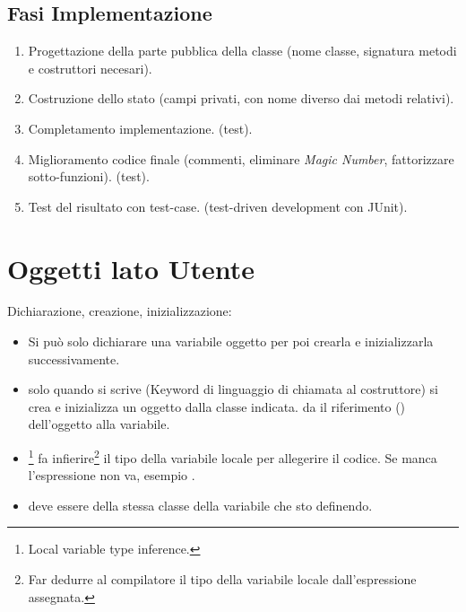 \subsection{Fasi Implementazione}
\begin{enumerate}
	\item Progettazione della parte pubblica della classe (nome classe, signatura metodi e costruttori necesari).
	\item Costruzione dello stato (campi privati, con nome diverso dai metodi relativi).
	\item Completamento implementazione. (test).
	\item Miglioramento codice finale (commenti, eliminare \textit{Magic Number}, fattorizzare sotto-funzioni). (test).
	\item Test del risultato con test-case. (test-driven development con JUnit).
\end{enumerate}

\section{Oggetti lato Utente}
Dichiarazione, creazione, inizializzazione:

\begin{itemize}
	\item {} Si può solo dichiarare una variabile oggetto per poi crearla e inizializzarla successivamente.
	\item solo quando si scrive  (Keyword di linguaggio di chiamata al costruttore) si crea e inizializza un oggetto dalla classe indicata.  da il riferimento () dell'oggetto alla variabile.
	\item {}\footnote{Local variable type inference.} fa infierire\footnote{Far dedurre al compilatore il tipo della variabile locale dall'espressione assegnata.} il tipo della variabile locale per allegerire il codice. Se manca l'espressione non va, esempio .
	\item {} deve essere della stessa classe della variabile che sto definendo.
\end{itemize}